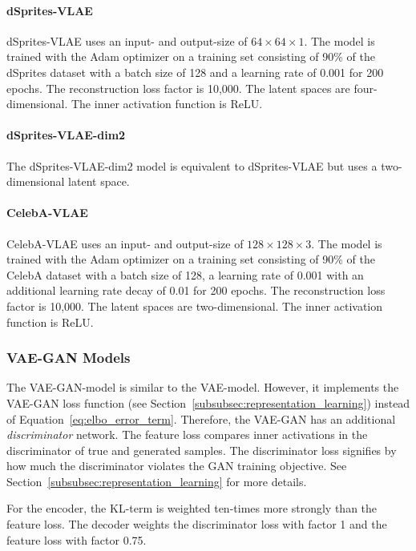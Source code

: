 \paragraph{dSprites-\ac{VLAE}} dSprites-\ac{VLAE} uses an input- and output-size of $64\times 64\times 1$.
The model is trained with the Adam optimizer on a training set consisting of 90\% of the dSprites dataset with a batch size of 128 and a learning rate of 0.001 for 200 epochs.
The reconstruction loss factor is 10,000.
The latent spaces are four-dimensional.
The inner activation function is ReLU.

\paragraph{dSprites-\ac{VLAE}-dim2}
The dSprites-\ac{VLAE}-dim2 model is equivalent to dSprites-\ac{VLAE} but uses a two-dimensional latent space.

\paragraph{CelebA-\ac{VLAE}} CelebA-\ac{VLAE} uses an input- and output-size of $128\times 128\times 3$.
The model is trained with the Adam optimizer on a training set consisting of 90\% of the CelebA dataset with a batch size of 128, a learning rate of 0.001 with an additional learning rate decay of 0.01 for 200 epochs.
The reconstruction loss factor is 10,000.
The latent spaces are two-dimensional.
The inner activation function is ReLU.

\subsubsection{VAE-GAN Models}\label{subsubsec:vae_gan_models}

The \ac{VAE}-\ac{GAN}-model is similar to the \ac{VAE}-model.
However, it implements the \ac{VAE}-\ac{GAN} loss function (see Section~\ref{subsubsec:representation_learning}) instead of Equation~\ref{eq:elbo_error_term}.
Therefore, the \ac{VAE}-\ac{GAN} has an additional \textit{discriminator} network.
The feature loss compares inner activations in the discriminator of true and generated samples.
The discriminator loss signifies by how much the discriminator violates the \ac{GAN} training objective.
See Section~\ref{subsubsec:representation_learning} for more details.

For the encoder, the \ac{KL}-term is weighted ten-times more strongly than the feature loss.
The decoder weights the discriminator loss with factor 1 and the feature loss with factor 0.75.

